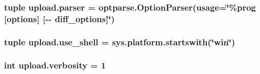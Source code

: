 \subsubsection[{parser}]{\setlength{\rightskip}{0pt plus 5cm}tuple upload.\+parser = optparse.\+Option\+Parser(usage=\char`\"{}\%prog \mbox{[}options\mbox{]} \mbox{[}-\/-\/ diff\+\_\+options\mbox{]}\char`\"{})}\label{namespaceupload_ab5aa3907065d7ff1de1405c141940845}
\hypertarget{namespaceupload_a9e2d52f1f1f7d80f35bbdf032e04893c}{}
\subsubsection[{use\+\_\+shell}]{\setlength{\rightskip}{0pt plus 5cm}tuple upload.\+use\+\_\+shell = sys.\+platform.\+startswith(\char`\"{}win\char`\"{})}\label{namespaceupload_a9e2d52f1f1f7d80f35bbdf032e04893c}
\hypertarget{namespaceupload_a6e5956e7e291024e2fcf32034f7cf7a7}{}
\subsubsection[{verbosity}]{\setlength{\rightskip}{0pt plus 5cm}int upload.\+verbosity = 1}\label{namespaceupload_a6e5956e7e291024e2fcf32034f7cf7a7}
